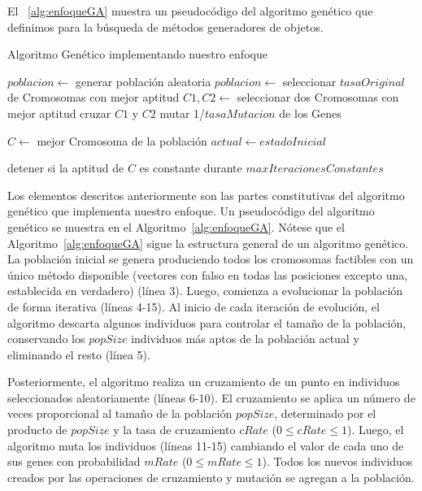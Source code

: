 El ~\ref{alg:enfoqueGA} muestra un pseudocódigo del algoritmo genético que definimos para la búsqueda de métodos generadores de objetos.


\begin{algorithm}
  \caption{Algoritmo Genético implementando nuestro enfoque}
  \label{alg:enfoqueGA}
  \begin{algorithmic}[1]
  
  \STATE $poblacion \gets $ generar población aleatoria
      \STATE $poblacion \leftarrow $ seleccionar $tasaOriginal$ de Cromosomas con mejor aptitud
          \STATE $C1, C2 \gets $ seleccionar dos Cromosomas con mejor aptitud
          \STATE cruzar $C1$ y $C2$
      \ENDFOR
          \STATE mutar 1/$tasaMutacion$ de los Genes
      \ENDFOR
  \ENDFOR
  
  \STATE $C \gets$ mejor Cromosoma de la población
  \STATE $actual \gets estadoInicial$

  \STATE detener si la aptitud de $C$ es constante durante $maxIteracionesConstantes$
  
\end{algorithmic}
\end{algorithm}


Los elementos descritos anteriormente son las partes constitutivas del algoritmo genético que implementa nuestro enfoque. Un pseudocódigo del algoritmo genético se muestra en el Algoritmo~\ref{alg:enfoqueGA}. 
Nótese que el Algoritmo~\ref{alg:enfoqueGA} sigue la estructura general de un algoritmo genético. 
La población inicial se genera produciendo todos los cromosomas factibles con un único método disponible 
(vectores con falso en todas las posiciones excepto una, establecida en verdadero) (línea 3). 
Luego, comienza a evolucionar la población de forma iterativa (líneas 4-15). 
Al inicio de cada iteración de evolución, el algoritmo descarta algunos individuos para controlar el tamaño de la población, 
conservando los $popSize$ individuos más aptos de la población actual y eliminando el resto (línea 5). 

Posteriormente, el algoritmo realiza un cruzamiento de un punto en individuos seleccionados aleatoriamente (líneas 6-10). 
El cruzamiento se aplica un número de veces proporcional al tamaño de la población $popSize$, 
determinado por el producto de $popSize$ y la tasa de cruzamiento $cRate$ ($0 \leq cRate \leq 1$). 
Luego, el algoritmo muta los individuos (líneas 11-15) cambiando el valor de cada uno de sus genes con probabilidad $mRate$ ($0 \leq mRate \leq 1$). 
Todos los nuevos individuos creados por las operaciones de cruzamiento y mutación se agregan a la población.

